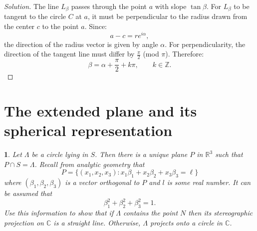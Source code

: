 \documentclass[12pt, a4paper]{report}
\theoremstyle{spaced}
\newtheorem{exercise}{}
\newcommand{\setexercise}[1]{\setcounter{exercise}{#1-1}}
\begin{document}
\begin{proof}[Solution]
	The line $L_\beta$ passes through the point $a$ with slope $\tan\beta$.
	For $L_\beta$ to be tangent to the circle $C$ at $a$, it must be perpendicular to the radius drawn from the center $c$ to the point $a$.
	Since:
	\[
		a - c = r e^{i\alpha},
	\]
	the direction of the radius vector is given by angle $\alpha$.
	For perpendicularity, the direction of the tangent line must differ by $\tfrac{\pi}{2}$ (mod $\pi$).
	Therefore:
	\[
		\beta = \alpha + \frac{\pi}{2} + k\pi,
		\qquad k \in \mathbb{Z}.
	\]
\end{proof}

\section{The extended plane and its spherical representation}
\setexercise{4}
\begin{exercise}
	Let $\Lambda$ be a circle lying in $S$. Then there is a unique plane $P$ in $\mathbb{R}^3$ such that $P \cap S = \Lambda$.
	Recall from analytic geometry that
	\[
		P = \{ (x_1, x_2, x_3) : x_1 \beta_1 + x_2 \beta_2 + x_3 \beta_3 = \ell \}
	\]
	where $(\beta_1, \beta_2, \beta_3)$ is a vector orthogonal to $P$ and $l$ is some real number.
	It can be assumed that
	\[
		\beta_1^2 + \beta_2^2 + \beta_3^2 = 1.
	\]
	Use this information to show that if $\Lambda$ contains the point $N$ then its stereographic projection on $\mathbb{C}$ is a straight line.
	Otherwise, $\Lambda$ projects onto a circle in $\mathbb{C}$.
\end{exercise}
\end{document}
